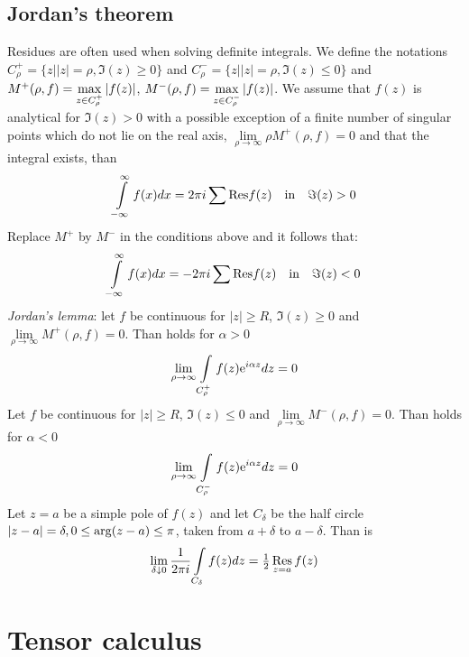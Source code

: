\documentclass[twoside]{report}
\begin{document}
\section{Jordan's theorem}
Residues are often used when solving definite integrals. We define the notations
$C_\rho^+=\{z||z|=\rho,\Im(z)\geq0\}$ and $C_\rho^-=\{z||z|=\rho,\Im(z)\leq0\}$
and $M^+(\rho,f)=\mathop{\rm max}\limits_{z\in C_\rho^+}|f(z)|$,
$M^-(\rho,f)=\mathop{\rm max}\limits_{z\in C_\rho^-}|f(z)|$. We assume that
$f(z)$ is analytical for $\Im(z)>0$ with a possible exception of a finite number
of singular points which do not lie on the real axis,
$\lim\limits_{\rho\rightarrow\infty}\rho M^+(\rho,f)=0$ and that the integral
exists, than
\[
\int\limits_{-\infty}^\infty f(x)dx=2\pi i\sum{\rm Res}f(z)~~~\mbox{in}~~~\Im(z)>0
\]
Replace $M^+$ by $M^-$ in the conditions above and it follows that:
\[
\int\limits_{-\infty}^\infty f(x)dx=-2\pi i\sum{\rm Res}f(z)~~~\mbox{in}~~~\Im(z)<0
\]
{\it Jordan's lemma}: let $f$ be continuous for $|z|\geq R$, $\Im(z)\geq0$ and
$\lim\limits_{\rho\rightarrow\infty}M^+(\rho,f)=0$. Than holds for $\alpha>0$
\[
\lim_{\rho\rightarrow\infty}\int\limits_{C_\rho^+}f(z){\rm e}^{i\alpha z}dz=0
\]
Let $f$ be continuous for $|z|\geq R$, $\Im(z)\leq0$ and
$\lim\limits_{\rho\rightarrow\infty}M^-(\rho,f)=0$. Than holds for $\alpha<0$
\[
\lim_{\rho\rightarrow\infty}\int\limits_{C_\rho^-}f(z){\rm e}^{i\alpha z}dz=0
\]
Let $z=a$ be a simple pole of $f(z)$ and let $C_\delta$ be the half circle
$|z-a|=\delta,0\leq{\rm arg}(z-a)\leq\pi$, taken from $a+\delta$ to
$a-\delta$. Than is
\[
\lim_{\delta\downarrow0}\frac{1}{2\pi i}\int\limits_{C_\delta}f(z)dz=\mbox{$\frac{1}{2}$}\mathop{\rm Res}\limits_{z=a}f(z)
\]


\chapter{Tensor calculus}
\end{document}
